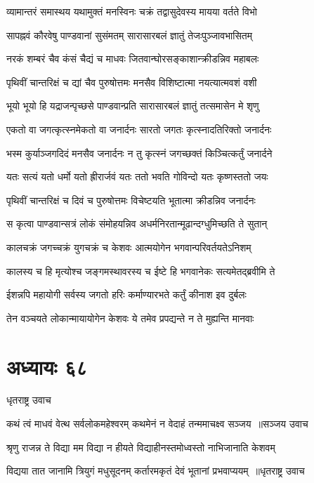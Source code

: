\twolineshloka
{व्यामान्तरं समास्थय यथामुक्तं मनस्विनः}
{चक्रं तद्वासुदेवस्य मायया वर्तते विभो}


\twolineshloka
{सापह्नवं कौरवेषु पाण्डवानां सुसंमतम्}
{सारासारबलं ज्ञातुं तेजःपुञ्जावभासितम्}


\twolineshloka
{नरकं शम्बरं चैव कंसं चैद्यं च माधवः}
{जितवान्घोरसङ्काशान्क्रीडन्निव महाबलः}


\twolineshloka
{पृथिवीं चान्तरिक्षं च द्यां चैव पुरुषोत्तमः}
{मनसैव विशिष्टात्मा नयत्यात्मवशं वशी}


\twolineshloka
{भूयो भूयो हि यद्राजन्पृच्छसे पाण्डवान्प्रति}
{सारासारबलं ज्ञातुं तत्समासेन मे शृणु}


\twolineshloka
{एकतो वा जगत्कृत्स्नमेकतो वा जनार्दनः}
{सारतो जगतः कृत्स्नादतिरिक्तो जनार्दनः}


\twolineshloka
{भस्म कुर्याञ्जगदिदं मनसैव जनार्दनः}
{न तु कृत्स्नं जगच्छक्तं किञ्चित्कर्तुं जनार्दने}


\twolineshloka
{यतः सत्यं यतो धर्मो यतो ह्रीरार्जवं यतः}
{ततो भवति गोविन्दो यतः कृष्णस्ततो जयः}


\twolineshloka
{पृथिवीं चान्तरिक्षं च दिवं च पुरुषोत्तमः}
{विचेष्टयति भूतात्मा क्रीडन्निव जनार्दनः}


\twolineshloka
{स कृत्वा पाण्डवान्सत्रं लोकं संमोहयन्निव}
{अधर्मनिरतान्मूढान्दग्धुमिच्छति ते सुतान्}


\twolineshloka
{कालचक्रं जगच्चक्रं युगचक्रं च केशवः}
{आत्मयोगेन भगवान्परिवर्तयतेऽनिशम्}


\twolineshloka
{कालस्य च हि मृत्योश्च जङ्गमस्थावरस्य च}
{ईष्टे हि भगवानेकः सत्यमेतद्ब्रवीमि ते}


\twolineshloka
{ईशन्नपि महायोगी सर्वस्य जगतो हरिः}
{कर्माण्यारभते कर्तुं कीनाश इव दुर्बलः}


\twolineshloka
{तेन वञ्चयते लोकान्मायायोगेन केशवः}
{ये तमेव प्रपद्यन्ते न ते मुह्यन्ति मानवाः}


\chapter{अध्यायः ६८}
\twolineshloka
{धृतराष्ट्र उवाच}
{}


\threelineshloka
{कथं त्वं माधवं वेत्थ सर्वलोकमहेश्वरम्}
{कथमेनं न वेदाहं तन्ममाचक्ष्व सञ्जय ॥सञ्जय उवाच}
{}


\twolineshloka
{श्रृणु राजन्न ते विद्या मम विद्या न हीयते}
{विद्याहीनस्तमोध्वस्तो नाभिजानाति केशवम्}


\threelineshloka
{विद्यया तात जानामि त्रियुगं मधुसूदनम्}
{कर्तारमकृतं देवं भूतानां प्रभवाप्ययम् ॥धृतराष्ट्र उवाच}
{}



